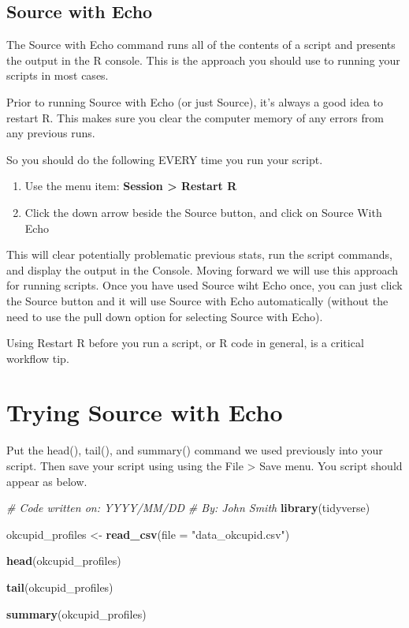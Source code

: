 \documentclass[
]{krantz}
\makeatletter
\newenvironment{Shaded}{\begin{snugshade}}{\end{snugshade}}
\newcommand{\CommentTok}[1]{\textcolor[rgb]{0.37,0.37,0.37}{\textit{#1}}}
\newcommand{\DataTypeTok}[1]{\textcolor[rgb]{0.27,0.27,0.27}{#1}}
\newcommand{\KeywordTok}[1]{\textcolor[rgb]{0.27,0.27,0.27}{\textbf{#1}}}
\newcommand{\NormalTok}[1]{#1}
\newcommand{\StringTok}[1]{\textcolor[rgb]{0.5,0.5,0.5}{#1}}
\providecommand{\tightlist}{%
  \setlength{\itemsep}{0pt}\setlength{\parskip}{0pt}}
\newenvironment{kframe}{%
\medskip{}
\setlength{\fboxsep}{.8em}
 \def\at@end@of@kframe{}%
 \ifinner\ifhmode%
  \def\at@end@of@kframe{\end{minipage}}%
  \begin{minipage}{\columnwidth}%
 \fi\fi%
 \def\FrameCommand##1{\hskip\@totalleftmargin \hskip-\fboxsep
 \colorbox{shadecolor}{##1}\hskip-\fboxsep
     \hskip-\linewidth \hskip-\@totalleftmargin \hskip\columnwidth}%
 \MakeFramed {\advance\hsize-\width
   \@totalleftmargin\z@ \linewidth\hsize
   \@setminipage}}%
 {\par\unskip\endMakeFramed%
 \at@end@of@kframe}
\newenvironment{rmdblock}[1]
  {
  \begin{itemize}
  \renewcommand{\labelitemi}{
    \raisebox{-.7\height}[0pt][0pt]{
      {\setkeys{Gin}{width=3em,keepaspectratio}\texttt{[image: images/\#1]}}
    }
  }
  \setlength{\fboxsep}{1em}
  \begin{kframe}
  \item
  }
  {
  \end{kframe}
  \end{itemize}
  }
\newenvironment{rmdcaution}
  {\begin{rmdblock}{caution}}
  {\end{rmdblock}}
\renewenvironment{Shaded}{\begin{kframe}}{\end{kframe}}
\makeatother
\begin{document}
\hypertarget{source-with-echo}{%
\subsection{Source with Echo}\label{source-with-echo}}

The Source with Echo command runs all of the contents of a script and presents the output in the R console. This is the approach you should use to running your scripts in most cases.

Prior to running Source with Echo (or just Source), it's always a good idea to restart R. This makes sure you clear the computer memory of any errors from any previous runs.

So you should do the following EVERY time you run your script.

\begin{enumerate}
\def\labelenumi{\arabic{enumi}.}
\tightlist
\item
  Use the menu item: \textbf{Session \textgreater{} Restart R}
\item
  Click the down arrow beside the Source button, and click on Source With Echo
\end{enumerate}

This will clear potentially problematic previous stats, run the script commands, and display the output in the Console. Moving forward we will use this approach for running scripts. Once you have used Source wiht Echo once, you can just click the Source button and it will use Source with Echo automatically (without the need to use the pull down option for selecting Source with Echo).

\begin{rmdcaution}
Using Restart R before you run a script, or R code in general, is a critical workflow tip.
\end{rmdcaution}

\hypertarget{trying-source-with-echo}{%
\section{Trying Source with Echo}\label{trying-source-with-echo}}

Put the head(), tail(), and summary() command we used previously into your script. Then save your script using using the File \textgreater{} Save menu. You script should appear as below.

\begin{Shaded}
\begin{Highlighting}[]
\CommentTok{# Code written on: YYYY/MM/DD }
\CommentTok{# By: John Smith}
\KeywordTok{library}\NormalTok{(tidyverse)}

\NormalTok{okcupid_profiles <-}\StringTok{ }\KeywordTok{read_csv}\NormalTok{(}\DataTypeTok{file =} \StringTok{"data_okcupid.csv"}\NormalTok{)}

\KeywordTok{head}\NormalTok{(okcupid_profiles)}

\KeywordTok{tail}\NormalTok{(okcupid_profiles)}

\KeywordTok{summary}\NormalTok{(okcupid_profiles)}
\end{Highlighting}
\end{Shaded}
\end{document}

